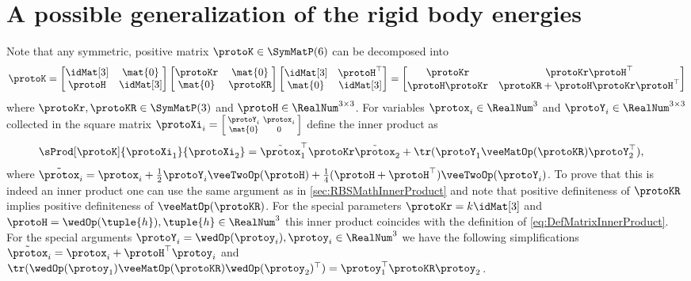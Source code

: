 \section{A possible generalization of the rigid body energies}\label{sec:GenRigidBodyPotential}
Note that any symmetric, positive matrix $\protoK \in \SymMatP(6)$ can be decomposed into
\begin{align}
 \protoK
 = \begin{bmatrix} \idMat[3] & \mat{0} \\ \protoH & \idMat[3] \end{bmatrix}
   \begin{bmatrix} \protoKr & \mat{0} \\ \mat{0} & \protoKR \end{bmatrix}
   \begin{bmatrix} \idMat[3] & \protoH^\top \\ \mat{0} & \idMat[3] \end{bmatrix}
 = \begin{bmatrix} \protoKr & \protoKr \protoH^\top\\ \protoH \protoKr & \protoKR + \protoH \protoKr \protoH^\top \end{bmatrix}
\end{align}
where $\protoKr, \protoKR \in \SymMatP(3)$ and $\protoH \in \RealNum^{3\times3}$.
For variables $\protox_i \in \RealNum^3$ and $\protoY_i \in \RealNum^{3\times3}$ collected in the square matrix $\protoXi_i = \left[\begin{smallmatrix} \protoY_i & \protox_i \\ \mat{0} & 0 \end{smallmatrix}\right]$ define the inner product as
\begin{align}\label{eq:DefGenRogodBodyInnerProduct}
 \sProd[\protoK]{\protoXi_1}{\protoXi_2} &= \tilde{\protox}_1^\top \protoKr \tilde{\protox}_2 + \tr(\protoY_1 \veeMatOp(\protoKR) \protoY_2^\top),
\end{align}
where $\tilde{\protox}_i = \protox_i + \tfrac{1}{2} \protoY_i\veeTwoOp(\protoH) + \tfrac{1}{4}(\protoH+\protoH^\top)\veeTwoOp(\protoY_i)$.
To prove that this is indeed an inner product one can use the same argument as in \autoref{sec:RBSMathInnerProduct} and note that positive definiteness of $\protoKR$ implies positive definiteness of $\veeMatOp(\protoKR)$.
For the special parameters $\protoKr = k\idMat[3]$ and $\protoH = \wedOp(\tuple{h}), \tuple{h}\in\RealNum^3$ this inner product coincides with the definition of \eqref{eq:DefMatrixInnerProduct}.
For the special arguments $\protoY_i = \wedOp(\protoy_i), \protoy_i\in \RealNum^3$ we have the following simplifications $\tilde{\protox}_i = \protox_i + \protoH^\top \protoy_i$ and $\tr(\wedOp(\protoy_1) \veeMatOp(\protoKR) \wedOp(\protoy_2)^\top) = \protoy_1^\top \protoKR \protoy_2$.
